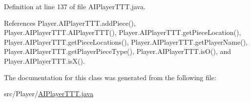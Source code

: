 Definition at line 137 of file A\+I\+Player\+T\+T\+T.\+java.



References Player.\+A\+I\+Player\+T\+T\+T.\+add\+Piece(), Player.\+A\+I\+Player\+T\+T\+T.\+A\+I\+Player\+T\+T\+T(), Player.\+A\+I\+Player\+T\+T\+T.\+get\+Piece\+Location(), Player.\+A\+I\+Player\+T\+T\+T.\+get\+Piece\+Locations(), Player.\+A\+I\+Player\+T\+T\+T.\+get\+Player\+Name(), Player.\+A\+I\+Player\+T\+T\+T.\+get\+Player\+Piece\+Type(), Player.\+A\+I\+Player\+T\+T\+T.\+is\+O(), and Player.\+A\+I\+Player\+T\+T\+T.\+is\+X().



The documentation for this class was generated from the following file\+:\begin{DoxyCompactItemize}
\item 
src/\+Player/\hyperlink{_a_i_player_t_t_t_8java}{A\+I\+Player\+T\+T\+T.\+java}\end{DoxyCompactItemize}

